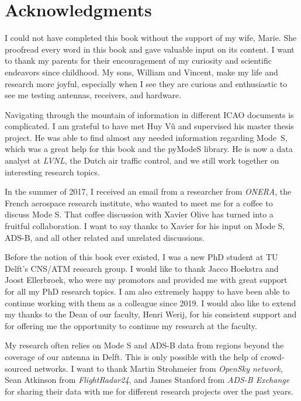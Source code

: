 \chapter*{Acknowledgments}

\vspace{-0.3cm}

{
I could not have completed this book without the support of my wife, Marie. She proofread every word in this book and gave valuable input on its content. I want to thank my parents for their encouragement of my curiosity and scientific endeavors since childhood. My sons, William and Vincent, make my life and research more joyful, especially when I see they are curious and enthusiastic to see me testing antennas, receivers, and hardware.

Navigating through the mountain of information in different ICAO documents is complicated. I am grateful to have met Huy V\^u and supervised his master thesis project. He was able to find almost any needed information regarding Mode~S, which was a great help for this book and the pyModeS library. He is now a data analyst at \emph{LVNL}, the Dutch air traffic control, and we still work together on interesting research topics. 

In the summer of 2017, I received an email from a researcher from \emph{ONERA}, the French aerospace research institute, who wanted to meet me for a coffee to discuss Mode S. That coffee discussion with Xavier Olive has turned into a fruitful collaboration. I want to say thanks to Xavier for his input on Mode S, ADS-B, and all other related and unrelated discussions.

Before the notion of this book ever existed, I was a new PhD student at TU Delft's CNS/ATM research group. I would like to thank Jacco Hoekstra and Joost Ellerbroek, who were my promotors and provided me with great support for all my PhD research topics. I am also extremely happy to have been able to continue working with them as a colleague since 2019. I would also like to extend my thanks to the Dean of our faculty, Henri Werij, for his consistent support and for offering me the opportunity to continue my research at the faculty. 

My research often relies on Mode S and ADS-B data from regions beyond the coverage of our antenna in Delft. This is only possible with the help of crowd-sourced networks. I want to thank Martin Strohmeier from \emph{OpenSky network}, Sean Atkinson from \emph{FlightRadar24}, and James Stanford from \emph{ADS-B Exchange} for sharing their data with me for different research projects over the past years.

}
